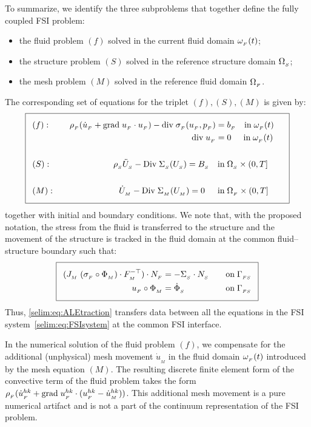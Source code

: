 To summarize, we identify the three subproblems that together define
the fully coupled FSI problem:
\begin{itemize}
\item
the fluid problem $(f)$ solved in the current fluid domain $\omega_{_{F}}(t)$;
\item
the structure problem $(S)$ solved in the reference structure domain $\Omega_{_{S}}$;
\item
the mesh problem $(M)$ solved in the reference fluid domain $\Omega_{_{F}}$.
\end{itemize}
The corresponding set of equations for the triplet
$(f),(S),(M)$ is given by:
\begin{equation}
  \addtolength{\fboxsep}{5pt} \boxed{
    \begin{split}\label{selim:eq:FSIsystem}
   &(f):&\quad \rhoF(\dotuF + \graduF\cdot\uF) -
      \divv\sigmaF(\uF,\pF) =\;& \bff \quad
      \textrm{in}\;\oF(t)\\ &&\divv\uF =\;&
      0\:\:\quad\textrm{in}\;\oF(t)& \\\\ &(S):&\quad  \rhoS \ddotUS -
      \Divv \SigmaS(\US) = \BS \quad \textrm{in}\; &\OS\times
      (0,T]&\\\\ &(M):&\quad \dot{U}_{_{M}} - \Divv \SigmaM(\UM) = 0
  \;\:\quad\textrm{in}\; &\OF\times (0,T]&
    \end{split}
 }
\end{equation}
together with initial and boundary conditions. We note that, with the
proposed notation, the stress from the fluid is transferred to the
structure and the movement of the structure is tracked in the fluid
domain at the common fluid--structure boundary such that:
\begin{equation}
  \addtolength{\fboxsep}{5pt} \boxed{
    \begin{split}\label{selim:eq:ALEtraction}
      (J_{_{M}}\;(\sigmaF\circ\PhiM) \cdot F_{_{M}}^{-\top})\cdot
      N_{_{F}} &=  - \SigmaS\cdot N_{_{S}} \quad &\textrm{on}\; \Gamma_{_{FS}}\\
      \uF\circ\PhiM &= \dot{\Phi}_{_{S}} \quad &\textrm{on}\; \Gamma_{_{FS}}\\
    \end{split}
  }
\end{equation}
Thus, \eqref{selim:eq:ALEtraction} transfers data between all the
equations in the FSI system~\eqref{selim:eq:FSIsystem} at the common
FSI interface.

In the numerical solution of the fluid problem $(f)$, we compensate
for the additional (unphysical) mesh movement $\dot{u}_{_{M}}$ in the
fluid domain $\omega_{_{F}}(t)$ introduced by the mesh equation $(M)$.  The
resulting discrete finite element form of the convective term of the
fluid problem takes the form $\rho_{_{F}}(\dot{u}_{_{F}}^{hk} +
\textrm{grad}\;u_{_{F}}^{hk}\cdot(u_{_{F}}^{hk} - \dot{u}_{_{M}}^{hk}))$. This additional mesh
movement is a pure numerical artifact and is not a part of the
continuum representation of the FSI problem.

